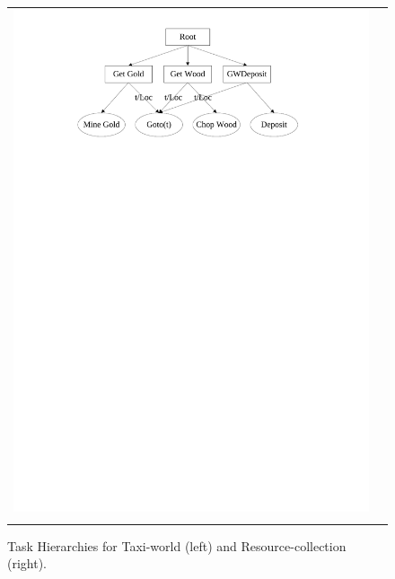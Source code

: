 \begin{figure}[ht]
\begin{tabular}{cc}
\hspace{-2.5in}\includegraphics[scale=0.6]{Wargus-Hierarchy.pdf}\\
\vspace{-5.2in}
\end{tabular}
\caption{Task Hierarchies for {\sf Taxi-world} (left) and {\sf Resource-collection} (right).}\label{fig:tasks}
\end{figure}

